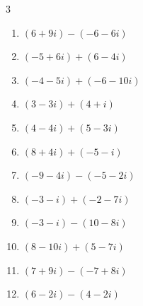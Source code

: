 \begin{multicols}{3}
\begin{enumerate}
        \phantom{$\displaystyle =6-2i$}

  \item $\displaystyle (6+9i) - (-6-6i)$

        \phantom{$\displaystyle =12+15i$}

  \item $\displaystyle (-5+6i) + (6-4i)$

        \phantom{$\displaystyle =1+2i$}

  \item $\displaystyle (-4-5i) + (-6-10i)$

        \phantom{$\displaystyle =-10-15i$}

  \item $\displaystyle (3-3i) + (4+i)$

        \phantom{$\displaystyle =7-2i$}

  \item $\displaystyle (4-4i) + (5-3i)$

        \phantom{$\displaystyle =9-7i$}

\columnbreak %

\resetques

  \item $\displaystyle (8+4i) + (-5-i)$

        \phantom{$\displaystyle =3+3i$}

  \item $\displaystyle (-9-4i) - (-5-2i)$

        \phantom{$\displaystyle =-4-2i$}

  \item $\displaystyle (-3-i) + (-2-7i)$

        \phantom{$\displaystyle =-5-8i$}

  \item $\displaystyle (-3-i) - (10-8i)$

        \phantom{$\displaystyle =-13+7i$}

  \item $\displaystyle (8-10i) + (5-7i)$

        \phantom{$\displaystyle =13-17i$}

  \item $\displaystyle (7+9i) - (-7+8i)$

        \phantom{$\displaystyle =14+i$}

  \item $\displaystyle (6-2i) - (4-2i)$

        \phantom{$\displaystyle =2$}


\end{enumerate}
\end{multicols}
